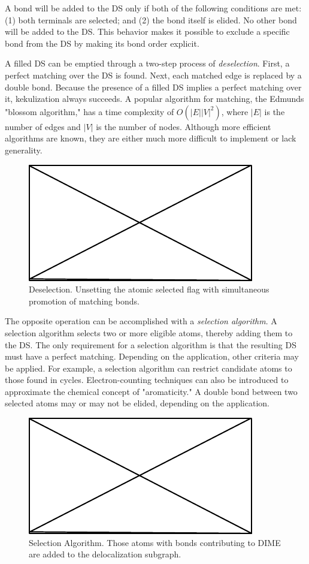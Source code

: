 \documentclass{article}
\begin{document}
A bond will be added to the DS only if both of the following conditions are met: (1) both terminals are selected; and (2) the bond itself is elided. No other bond will be added to the DS. This behavior makes it possible to exclude a specific bond from the DS by making its bond order explicit.

A filled DS can be emptied through a two-step process of \textit{deselection}. First, a perfect matching over the DS is found. Next, each matched edge is replaced by a double bond. Because the presence of a filled DS implies a perfect matching over it, kekulization always succeeds. A popular algorithm for matching, the Edmunds "blossom algorithm,"\cite{edmunds65} has a time complexity of $O(|E||V|^2)$, where $|E|$ is the number of edges and $|V|$ is the number of nodes. Although more efficient algorithms are known, they are either much more difficult to implement or lack generality.

\begin{figure}
    \centering
    \includegraphics{filler}
    \caption{Deselection. Unsetting the atomic selected flag with simultaneous promotion of matching bonds.}
    \label{fig:deselection}
\end{figure}

The opposite operation can be accomplished with a \textit{selection algorithm}. A selection algorithm selects two or more eligible atoms, thereby adding them to the DS. The only requirement for a selection algorithm is that the resulting DS must have a perfect matching. Depending on the application, other criteria may be applied. For example, a selection algorithm can restrict candidate atoms to those found in cycles. Electron-counting techniques can also be introduced to approximate the chemical concept of "aromaticity." A double bond between two selected atoms may or may not be elided, depending on the application.

\begin{figure}
    \centering
    \includegraphics{filler}
    \caption{Selection Algorithm. Those atoms with bonds contributing to DIME are added to the delocalization subgraph.}
    \label{fig:selection}
\end{figure}
\end{document}
